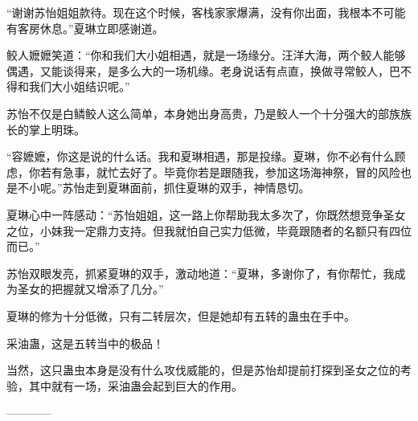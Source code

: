 \begin{this_body}
“谢谢苏怡姐姐款待。现在这个时候，客栈家家爆满，没有你出面，我根本不可能有客房休息。”夏琳立即感谢道。

鲛人嬷嬷笑道：“你和我们大小姐相遇，就是一场缘分。汪洋大海，两个鲛人能够偶遇，又能谈得来，是多么大的一场机缘。老身说话有点直，换做寻常鲛人，巴不得和我们大小姐结识呢。”

苏怡不仅是白鳞鲛人这么简单，本身她出身高贵，乃是鲛人一个十分强大的部族族长的掌上明珠。

“容嬷嬷，你这是说的什么话。我和夏琳相遇，那是投缘。夏琳，你不必有什么顾虑，你若有急事，就忙去好了。毕竟你若是跟随我，参加这场海神祭，冒的风险也是不小呢。”苏怡走到夏琳面前，抓住夏琳的双手，神情恳切。

夏琳心中一阵感动：“苏怡姐姐，这一路上你帮助我太多次了，你既然想竞争圣女之位，小妹我一定鼎力支持。但我就怕自己实力低微，毕竟跟随者的名额只有四位而已。”

苏怡双眼发亮，抓紧夏琳的双手，激动地道：“夏琳，多谢你了，有你帮忙，我成为圣女的把握就又增添了几分。”

夏琳的修为十分低微，只有二转层次，但是她却有五转的蛊虫在手中。

采油蛊，这是五转当中的极品！

当然，这只蛊虫本身是没有什么攻伐威能的，但是苏怡却提前打探到圣女之位的考验，其中就有一场，采油蛊会起到巨大的作用。

------------

\end{this_body}

